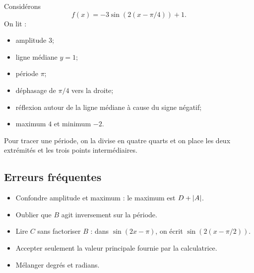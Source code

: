 Considérons
\[
f(x)=-3\sin(2(x-\pi/4))+1.
\]
On lit :
\begin{itemize}
\item amplitude $3$;
\item ligne médiane $y=1$;
\item période $\pi$;
\item déphasage de $\pi/4$ vers la droite;
\item réflexion autour de la ligne médiane à cause du signe négatif;
\item maximum $4$ et minimum $-2$.
\end{itemize}
Pour tracer une période, on la divise en quatre quarts et on place les deux extrémités et les trois points intermédiaires.

\subsection{Erreurs fréquentes}

\begin{itemize}
\item Confondre amplitude et maximum : le maximum est $D+\left\lvert A\right\rvert$.
\item Oublier que $B$ agit inversement sur la période.
\item Lire $C$ sans factoriser $B$ : dans $\sin(2x-\pi)$, on écrit $\sin(2(x-\pi/2))$.
\item Accepter seulement la valeur principale fournie par la calculatrice.
\item Mélanger degrés et radians.
\end{itemize}
